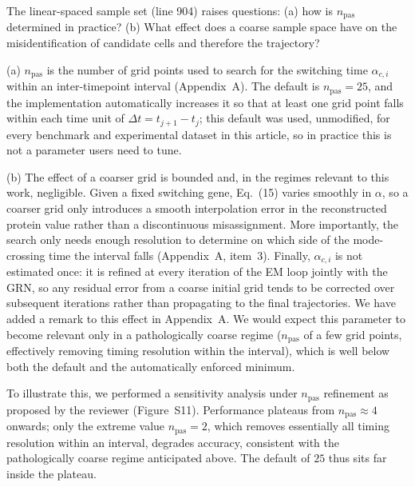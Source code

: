\documentclass[11pt,a4paper]{article}
\newcounter{revtotal}   %
\newcounter{revlocal}   %
\newcommand{\currentreviewer}{}  %
\newcommand{\revcomment}[2]{%
  \stepcounter{revtotal}%
  \stepcounter{revlocal}%
  \edef\commentlabel{\currentreviewer.\arabic{revlocal}}%
  \begin{tcolorbox}[revstyle,
      title={\commentlabel\ $|$\ #1}]
    #2
  \end{tcolorbox}%
  \edef\lastcommentlabel{\commentlabel}%
}
\newcommand{\response}[1]{%
  \begin{tcolorbox}[respstyle,
      title={Response to \lastcommentlabel}]
    #1
  \end{tcolorbox}%
}
\begin{document}
\revcomment{$n_{\mathrm{pas}}$: choice in practice and effect of coarse sampling}{%
The linear-spaced sample set (line 904) raises questions: (a) how is $n_{\mathrm{pas}}$ determined in
practice? (b) What effect does a coarse sample space have on the misidentification of
candidate cells and therefore the trajectory?}
\response{%
(a) $n_{\mathrm{pas}}$ is the number of grid points used to search for the switching time
$\alpha_{c,i}$ within an inter-timepoint interval (Appendix~A). The default is
$n_{\mathrm{pas}}=25$, and the implementation automatically increases it so that at least one
grid point falls within each time unit of $\Delta t = t_{j+1}-t_j$; this default was used,
unmodified, for every benchmark and experimental dataset in this article, so in practice this
is not a parameter users need to tune.

(b) The effect of a coarser grid is bounded and, in the regimes relevant to this work,
negligible. Given a fixed switching gene, Eq.~(15) varies smoothly in
$\alpha$, so a coarser grid only introduces a smooth interpolation error in the reconstructed
protein value rather than a discontinuous misassignment. More importantly, the search only
needs enough resolution to determine on which side of the mode-crossing time the interval
falls (Appendix~A, item~3). Finally, $\alpha_{c,i}$ is not estimated once: it is refined at every iteration of
the EM loop jointly with the GRN, so any residual error from a coarse initial grid tends to be
corrected over subsequent iterations rather than propagating to the final trajectories. We
have added a remark to this effect in Appendix~A. We would expect this parameter to become
relevant only in a pathologically coarse regime ($n_{\mathrm{pas}}$ of a few grid points,
effectively removing timing resolution within the interval), which is well below both the
default and the automatically enforced minimum. 

To illustrate this, we performed a sensitivity analysis under $n_{\mathrm{pas}}$ refinement as proposed by the reviewer (Figure~S11). Performance plateaus from $n_{\mathrm{pas}} \approx 4$ onwards; only the extreme value
$n_{\mathrm{pas}} = 2$, which removes essentially all timing resolution within an interval,
degrades accuracy, consistent with the pathologically coarse regime anticipated above. The
default of $25$ thus sits far inside the plateau.}
\end{document}
